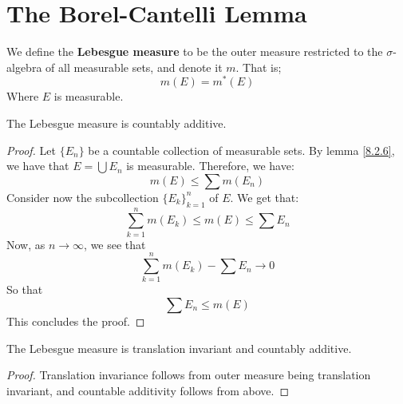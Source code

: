
\section{The Borel-Cantelli Lemma}

\begin{definition}
    We define the \textbf{Lebesgue measure} to be the outer measure restricted
    to the $\sigma$-algebra of all measurable sets, and denote it  $m$. That is;
    \begin{equation*}
        m(E)=m^*(E)
    \end{equation*}
    Where $E$ is measurable.
\end{definition}

\begin{lemma}\label{8.4.1}
    The Lebesgue measure is countably additive.
\end{lemma}
\begin{proof}
    Let $\{E_n\}$ be a countable collection of measurable sets. By lemma
    \ref{8.2.6}, we have that $E=\bigcup{E_n}$ is measurable. Therefore, we
    have:
    \begin{equation*}
        m(E) \leq \sum{m(E_n)}
    \end{equation*}
    Consider now the subcollection $\{E_k\}_{k=1}^n$ of $E$. We get that:
    \begin{equation*}
        \sum_{k=1}^n{m(E_k)} \leq m(E) \leq \sum{E_n}
    \end{equation*}
    Now, as $n \xrightarrow{} \infty$, we see that
    \begin{equation*}
        \sum_{k=1}^n{m(E_k)}-\sum{E_n} \xrightarrow{} 0
    \end{equation*}
    So that
    \begin{equation*}
        \sum{E_n} \leq m(E)
    \end{equation*}
    This concludes the proof.
\end{proof}

\begin{theorem}\label{8.4.2}
    The Lebesgue measure is translation invariant and countably additive.
\end{theorem}
\begin{proof}
    Translation invariance follows from outer measure being translation
    invariant, and countable additivity follows from above.
\end{proof}

